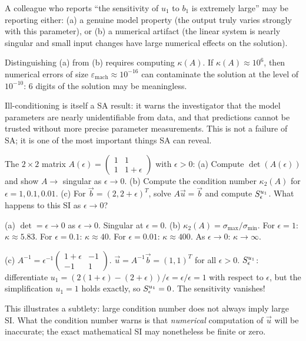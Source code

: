 A colleague who reports ``the sensitivity of $u_1$ to $b_1$
is extremely large'' may be reporting either:
(a) a genuine model property (the output truly varies strongly
    with this parameter), or
(b) a numerical artifact (the linear system is nearly singular
    and small input changes have large numerical effects on the solution).

Distinguishing (a) from (b) requires computing $\kappa(A)$.
If $\kappa(A) \approx 10^6$, then numerical errors of size
$\varepsilon_{\text{mach}} \approx 10^{-16}$ can contaminate the
solution at the level of $10^{-10}$: 6 digits of the solution
may be meaningless.

Ill-conditioning is itself a SA result: it warns the investigator
that the model parameters are nearly unidentifiable from data,
and that predictions cannot be trusted without more precise
parameter measurements.
This is not a failure of SA; it is one of the most important
things SA can reveal.

\begin{selfcheck}
The $2\times2$ matrix $A(\epsilon) = \begin{pmatrix} 1 & 1 \\ 1 & 1+\epsilon \end{pmatrix}$
with $\epsilon > 0$:
(a) Compute $\det(A(\epsilon))$ and show $A \to$ singular as $\epsilon \to 0$.
(b) Compute the condition number $\kappa_2(A)$ for $\epsilon = 1, 0.1, 0.01$.
(c) For $\vec{b} = (2, 2+\epsilon)^T$, solve $A\vec{u} = \vec{b}$ and compute
    $S_{\epsilon}^{u_1}$. What happens to this SI as $\epsilon \to 0$?
\end{selfcheck}
\begin{scAnswer}
(a) $\det = \epsilon \to 0$ as $\epsilon \to 0$. Singular at $\epsilon = 0$.
(b) $\kappa_2(A) = \sigma_{\max}/\sigma_{\min}$. For $\epsilon = 1$: $\kappa \approx 5.83$.
For $\epsilon = 0.1$: $\kappa \approx 40$. For $\epsilon = 0.01$: $\kappa \approx 400$.
As $\epsilon \to 0$: $\kappa \to \infty$.

(c) $A^{-1} = \epsilon^{-1}\begin{pmatrix}1+\epsilon & -1\\ -1 & 1\end{pmatrix}$.
$\vec{u} = A^{-1}\vec{b} = (1, 1)^T$ for all $\epsilon > 0$.
$S_{\epsilon}^{u_1}$: differentiate $u_1 = (2(1+\epsilon) - (2+\epsilon))/\epsilon
= \epsilon/\epsilon = 1$ with respect to $\epsilon$, but the simplification
$u_1 = 1$ holds exactly, so $S_{\epsilon}^{u_1} = 0$. The sensitivity vanishes!

This illustrates a subtlety: large condition number does not always imply large SI.
What the condition number warns is that \emph{numerical} computation of $\vec{u}$
will be inaccurate; the exact mathematical SI may nonetheless be finite or zero.
\end{scAnswer}

